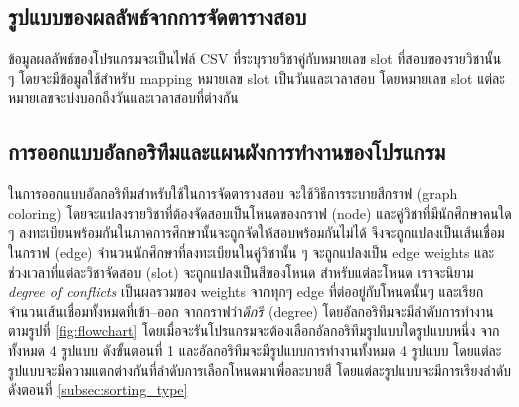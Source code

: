 \subsection{รูปแบบของผลลัพธ์จากการจัดตารางสอบ}
ข้อมูลผลลัพธ์ของโปรแกรมจะเป็นไฟล์ CSV ที่ระบุรายวิชาคู่กับหมายเลข slot ที่สอบของรายวิชานั้น ๆ โดยจะมีข้อมูลใช้สำหรับ mapping หมายเลข slot เป็นวันและเวลาสอบ
โดยหมายเลข slot แต่ละหมายเลขจะบ่งบอกถึงวันและเวลาสอบที่ต่างกัน

\subsection{การออกแบบอัลกอริทึมและแผนผังการทำงานของโปรแกรม}
ในการออกแบบอัลกอริทึมสำหรับใช้ในการจัดตารางสอบ จะใช้วิธีการระบายสีกราฟ (graph coloring) 
โดยจะแปลงรายวิชาที่ต้องจัดสอบเป็นโหนดของกราฟ (node) 
และคู่วิชาที่มีนักศึกษาคนใด ๆ ลงทะเบียนพร้อมกันในภาคการศึกษานั้นจะถูกจัดให้สอบพร้อมกันไม่ได้ 
จึงจะถูกแปลงเป็นเส้นเชื่อมในกราฟ (edge) จำนวนนักศึกษาที่ลงทะเบียนในคู่วิชานั้น ๆ จะถูกแปลงเป็น edge weights
และช่วงเวลาที่แต่ละวิชาจัดสอบ (slot) จะถูกแปลงเป็นสีของโหนด
สำหรับแต่ละโหนด เราจะนิยาม \emph{degree of conflicts} เป็นผลรวมของ weights จากทุกๆ edge ที่ต่ออยู่กับโหนดนั้นๆ
และเรียกจำนวนเส้นเชื่อมทั้งหมดที่เข้า--ออก จากกราฟว่า\emph{ดีกรี} (degree) 
โดยอัลกอริทึมจะมีลำดับการทำงานตามรูปที่ \ref{fig:flowchart} 
โดยเมื่อจะรันโปรแกรมจะต้องเลือกอัลกอริทึมรูปแบบใดรูปแบบหนึ่ง จากทั้งหมด 4 รูปแบบ ดังขั้นตอนที่ 1
และอัลกอริทึมจะมีรูปแบบการทำงานทั้งหมด 4 รูปแบบ โดยแต่ละรูปแบบจะมีความแตกต่างกันที่ลำดับการเลือกโหนดมาเพื่อละบายสี
โดยแต่ละรูปแบบจะมีการเรียงลำดับ ดังตอนที่ \ref{subsec:sorting_type}

